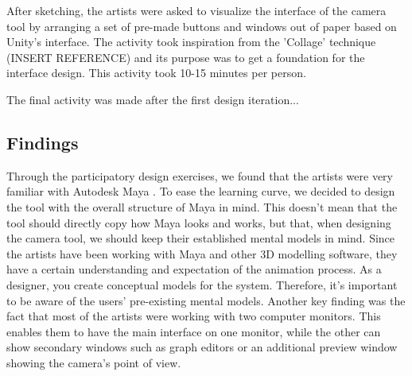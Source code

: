 After sketching, the artists were asked to visualize the interface of the camera tool by arranging a set of pre-made buttons and windows out of paper based on Unity's interface. The activity took inspiration from the 'Collage' technique (INSERT REFERENCE) and its purpose was to get a foundation for the interface design. This activity took 10-15 minutes per person.

The final activity was made after the first design iteration...

\subsection{Findings}
Through the participatory design exercises, we found that the artists were very familiar with Autodesk Maya \cite{MayaSource}. To ease the learning curve, we decided to design the tool with the overall structure of Maya in mind. This doesn't mean that the tool should directly copy how Maya looks and works, but that, when designing the camera tool, we should keep their established mental models \cite{mentalModels} in mind. Since the artists have been working with Maya and other 3D modelling software, they have a certain understanding and expectation of the animation process. As a designer, you create conceptual models for the system. Therefore, it's important to be aware of the users' pre-existing mental models. Another key finding was the fact that most of the artists were working with two computer monitors. This enables them to have the main interface on one monitor, while the other can show secondary windows such as graph editors or an additional preview window showing the camera's point of view.